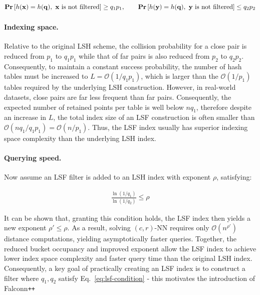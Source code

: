 \documentclass{article}
\newcommand{\bx}{\mathbf{x}}
\newcommand{\by}{\mathbf{y}}
\newcommand{\bq}{\mathbf{q}}
\newcommand{\bigO}{\mathcal{O}}
\newcommand{\fpp}{Falconn\texttt{++}\xspace}
\renewcommand{\Pr}[1]{\textrm{\bf Pr}\left[#1\right]}
\newcommand{\crNN}{$(c, r)$-NN\xspace}
\begin{document}
\begin{equation}
    \Pr{h(\bx)=h(\bq),\ \bx \text{ is not filtered}} \ge q_1 p_1,
    \qquad
    \Pr{h(\by)=h(\bq),\ \by \text{ is not filtered}} \le q_2 p_2
\end{equation}

\paragraph{Indexing space.}

Relative to the original LSH scheme, the collision probability for a close pair is reduced from $p_1$ to $q_1 p_1$ while that of far pairs is also reduced from $p_2$ to $q_2 p_2$. Consequently, to maintain a constant success probability, the number of hash tables must be increased to $L = \bigO(1/{q_1 p_1})$, which is larger than the $\bigO(1/p_1)$ tables required by the underlying LSH construction. However, in real-world datasets, close pairs are far less frequent than far pairs. Consequently, the expected number of retained points per table is well below $n q_1$, therefore despite an increase in $L$, the total index size of an LSF construction is often smaller than $\bigO(nq_1/q_1p_1) = \bigO(n/p_1)$. Thus, the LSF index usually has superior indexing space complexity than the underlying LSH index. 

\paragraph{Querying speed.} Now assume an LSF filter is added to an LSH index with exponent $\rho$, satisfying:

\begin{equation}
    \label{eq:lsf-condition}
    \begin{aligned}
        \frac{\ln(1/q_1)}{\ln(1/q_2)} \le \rho
    \end{aligned}
\end{equation}

It can be shown that, granting this condition holds, the LSF index then yields a new exponent $\rho' \le \rho$. As a result, solving \crNN requires only $\bigO(n^{\rho'})$ distance computations, yielding asymptotically faster queries. Together, the reduced bucket occupancy and improved exponent allow the LSF index to achieve lower index space complexity and faster query time than the original LSH index. Consequently, a key goal of practically creating an LSF index is to construct a filter where $q_1, q_2$ satisfy Eq.~\ref{eq:lsf-condition} - this motivates the introduction of \fpp
\end{document}
